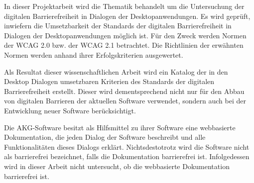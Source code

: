 
In dieser Projektarbeit wird die Thematik behandelt um die Untersuchung der digitalen Barrierefreiheit in Dialogen der Desktopanwendungen. Es wird geprüft, inwiefern die Umsetzbarkeit der Standards der digitalen Barrierefreiheit in Dialogen der Desktopanwendungen möglich ist. Für den Zweck werden Normen der \ac{WCAG} 2.0 bzw. der \ac{WCAG} 2.1 betrachtet. Die Richtlinien der erwähnten Normen werden anhand ihrer Erfolgskriterien ausgewertet.

Als Resultat dieser wissenschaftlichen Arbeit wird ein Katalog der in den Desktop Dialogen umsetzbaren Kriterien des Standards der digitalen Barrierefreiheit erstellt. Dieser wird dementsprechend nicht nur für den Abbau von digitalen Barrieren der aktuellen Software verwendet, sondern auch bei der Entwicklung neuer Software berücksichtigt.

Die AKG-Software besitzt als Hilfsmittel zu ihrer Software eine webbasierte Dokumentation, die jeden Dialog der Software beschreibt und alle Funktionalitäten dieses Dialogs erklärt. Nichtsdestotrotz wird die Software nicht als barrierefrei bezeichnet, falls die Dokumentation barrierefrei ist. Infolgedessen wird in dieser Arbeit nicht untersucht, ob die webbasierte Dokumentation barrierefrei ist.